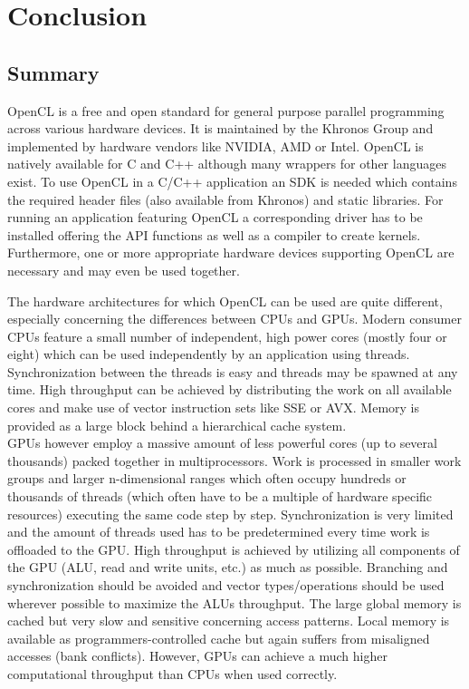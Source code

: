 \chapter{Conclusion}
\label{sec:conclusion}

\section{Summary}

OpenCL is a free and open standard for general purpose parallel programming across various hardware devices. It is maintained by the Khronos Group and implemented by hardware vendors like NVIDIA, AMD or Intel. OpenCL is natively available for C and C++ although many wrappers for other languages exist. To use OpenCL in a C/C++ application an SDK is needed which contains the required header files (also available from Khronos) and static libraries. For running an application featuring OpenCL a corresponding driver has to be installed offering the API functions as well as a compiler to create kernels. Furthermore, one or more appropriate hardware devices supporting OpenCL are necessary and may even be used together.

The hardware architectures for which OpenCL can be used are quite different, especially concerning the differences between CPUs and GPUs.
Modern consumer CPUs feature a small number of independent, high power cores (mostly four or eight) which can be used independently by an application using threads. Synchronization between the threads is easy and threads may be spawned at any time. High throughput can be achieved by distributing the work on all available cores and make use of vector instruction sets like SSE or AVX. Memory is provided as a large block behind a hierarchical cache system. \\
GPUs however employ a massive amount of less powerful cores (up to several thousands) packed together in multiprocessors. Work is processed in smaller work groups and larger n-dimensional ranges which often occupy hundreds or thousands of threads (which often have to be a multiple of hardware specific resources) executing the same code step by step. Synchronization is very limited and the amount of threads used has to be predetermined every time work is offloaded to the GPU. High throughput is achieved by utilizing all components of the GPU (ALU, read and write units, etc.) as much as possible. Branching and synchronization should be avoided and vector types/operations should be used wherever possible to maximize the ALUs throughput. The large global memory is cached but very slow and sensitive concerning access patterns. Local memory is available as programmers-controlled cache but again suffers from misaligned accesses (bank conflicts). However, GPUs can achieve a much higher computational throughput than CPUs when used correctly.

